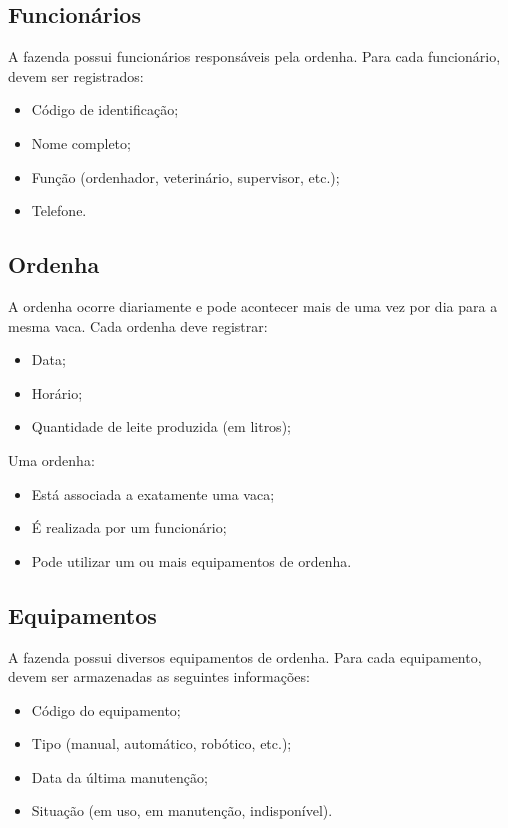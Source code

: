 \documentclass[12pt]{article}
\begin{document}
\subsection*{Funcionários}
A fazenda possui funcionários responsáveis pela ordenha.
Para cada funcionário, devem ser registrados:
\begin{itemize}
    \item Código de identificação;
    \item Nome completo;
    \item Função (ordenhador, veterinário, supervisor, etc.);
    \item Telefone.
\end{itemize}

\subsection*{Ordenha}
A ordenha ocorre diariamente e pode acontecer mais de uma vez por dia para a mesma vaca.
Cada ordenha deve registrar:
\begin{itemize}
    \item Data;
    \item Horário;
    \item Quantidade de leite produzida (em litros);
\end{itemize}

Uma ordenha:
\begin{itemize}
    \item Está associada a exatamente uma vaca;
    \item É realizada por um funcionário;
    \item Pode utilizar um ou mais equipamentos de ordenha.
\end{itemize}

\subsection*{Equipamentos}
A fazenda possui diversos equipamentos de ordenha.
Para cada equipamento, devem ser armazenadas as seguintes informações:
\begin{itemize}
    \item Código do equipamento;
    \item Tipo (manual, automático, robótico, etc.);
    \item Data da última manutenção;
    \item Situação (em uso, em manutenção, indisponível).
\end{itemize}
\end{document}
